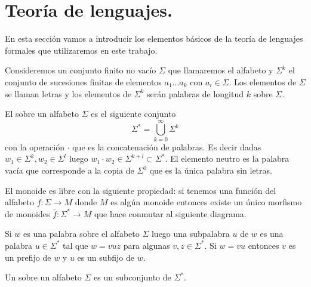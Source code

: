 \documentclass[tesis.tex]{subfiles}
\begin{document}
\chapter{Teoría de lenguajes.}	
En esta sección vamos a introducir los elementos básicos de la teoría de lenguajes formales que utilizaremos en este trabajo. 

Consideremos un conjunto finito no vacío $\Sigma$ que llamaremos el alfabeto y $\Sigma^k$ el conjunto de sucesiones finitas de elementos $a_1 \dots a_k$ con  $a_i \in \Sigma$. Los elementos de $\Sigma$ se llaman letras y los elementos de $\Sigma^k$ serán palabras de longitud $k$ sobre $\Sigma$. 
\begin{deff}
	El  sobre un alfabeto $\Sigma$ es el siguiente conjunto
	\begin{equation*}
	\Sigma^{*} = \bigcup_{k=0}^{\infty} \Sigma^k
	\end{equation*}
	con la operación $\cdot$ que es la concatenación de palabras. Es decir dadas $w_1 \in \Sigma^{k}, w_2 \in \Sigma^{l}$ luego $w_1 \cdot w_2 \in \Sigma^{k+l} \subset \Sigma^*$. El elemento neutro es la palabra vacía que corresponde a la copia de $\Sigma^0$ que es la única palabra sin letras. 
\end{deff}
\begin{obs}
	El monoide es libre con la siguiente propiedad: si tenemos una función del alfabeto $f: \Sigma \to M$ donde $M$ es algún monoide entonces existe un único morfismo de monoides $\overline f: \Sigma^{*} \to M$ que hace conmutar al siguiente diagrama.	
	
	\begin{center}
	\end{center}
	
\end{obs}

Si $w$ es una palabra sobre el alfabeto $\Sigma$ luego una subpalabra $u$ de $w$ es una palabra $u \in \Sigma^*$ tal que $w = vuz$ para algunas $v, z \in \Sigma^*$. Si $w = vu$ entonces $v$ es un prefijo de $w$ y $u$ es un subfijo de $w$.

\begin{deff}
	Un  sobre un alfabeto $\Sigma$ es un subconjunto de $\Sigma^*$.
\end{deff}
\end{document}
